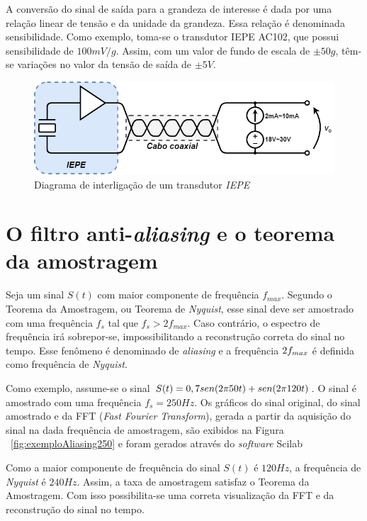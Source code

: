 \documentclass[11pt]{abntex2}
\begin{document}
				A conversão do sinal de saída para a grandeza de interesse é dada
				por uma relação linear de tensão e da unidade da grandeza. Essa
				relação é denominada sensibilidade. Como exemplo, toma-se o
				transdutor IEPE AC102, que possui sensibilidade de $100mV/g$.
				Assim, com um valor de fundo de escala de $\pm50g$, têm-se variações
				no valor da tensão de saída de $\pm5V$.\cite{ctc}
				\newpage

				\begin{figure}[H]
					\centering
					\includegraphics[width=\linewidth]{../../Fotos/Diagramas/iepe.png}
					\caption{Diagrama de interligação de um transdutor \textit{IEPE}}
					\label{fig:ligacaoIEPE}
				\end{figure}

			\section{O filtro anti-\textit{aliasing} e o teorema da amostragem}
				Seja um sinal $S(t)$ com maior componente de frequência
				$f_{max}$. Segundo o Teorema da Amostragem, ou Teorema de
				\textit{Nyquist}, esse sinal deve ser amostrado com uma
				frequência $f_s$ tal que $f_s>2f_{max}$. Caso contrário, o
				espectro de frequência irá sobrepor-se, impossibilitando a
				reconstrução correta do sinal no tempo. Esse fenômeno é denominado
				de \textit{aliasing} e a frequência $2\*f_{max}$ é definida como
				frequência de \textit{Nyquist}. \cite{nyquist}

				Como exemplo, assume-se o sinal $S(t) = 0,7\*sen(2\*\pi\*50\*t)
				+ sen(2\*\pi\*120\*t)$. O sinal é amostrado com uma frequência
				$f_s = 250Hz$. Os gráficos do sinal original, do sinal
				amostrado e da FFT (\textit{Fast Fourier Transform}), gerada a
				partir da aquisição do sinal na dada frequência de amostragem,
				são exibidos na Figura ~\ref{fig:exemploAliasing250} e foram gerados
				através do \textit{software} Scilab

				Como a maior componente de frequência do sinal $S(t)$ é $120Hz$,
				a frequência de \textit{Nyquist} é $240Hz$. Assim, a taxa de
				amostragem satisfaz o Teorema da Amostragem. Com isso possibilita-se
				uma correta visualização da FFT e da reconstrução do sinal no tempo.
\end{document}
